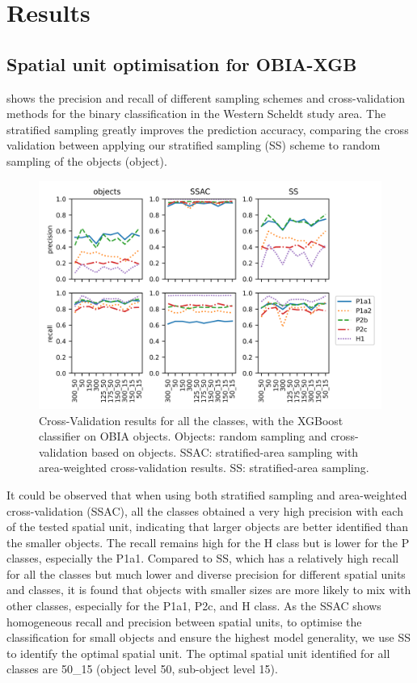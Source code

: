 \documentclass{isprs} %
\begin{document}
\section{Results}
\label{sec:results}

\subsection{Spatial unit optimisation for OBIA-XGB}
\label{sec:suo}

  shows the precision and recall of different sampling schemes and cross-validation methods for the binary classification in the Western Scheldt study area. The stratified sampling greatly improves the prediction accuracy, comparing the cross validation between applying our stratified sampling (SS) scheme to random sampling of the objects (object).
 
  \begin{figure}[!h]
    \centering
    \includegraphics[width=\linewidth]{figures/overview_total.png}
    \caption{Cross-Validation results for all the classes, with the XGBoost classifier on OBIA objects. Objects: random sampling and cross-validation based on objects. SSAC: stratified-area sampling with area-weighted cross-validation results. SS: stratified-area sampling.}
    \label{fig:overview}
\end{figure}

 It could be observed that when using both stratified sampling and area-weighted cross-validation (SSAC), all the classes obtained a very high precision with each of the tested spatial unit, indicating that larger objects are better identified than the smaller objects. The recall remains high for the H class but is lower for the P classes, especially the P1a1. Compared to SS, which has a relatively high recall for all the classes but much lower and diverse precision for different spatial units and classes, it is found that objects with smaller sizes are more likely to mix with other classes, especially for the P1a1, P2c, and H class. As the SSAC shows homogeneous recall and precision between spatial units, to optimise the classification for small objects and ensure the highest model generality, we use SS to identify the optimal spatial unit. The optimal spatial unit identified for all classes are 50\_15 (object level 50, sub-object level 15).   
 
\end{document}
